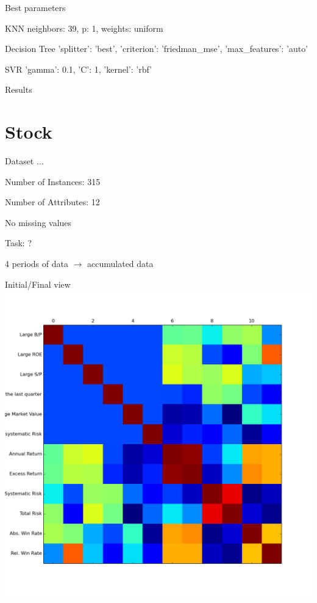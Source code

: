 \documentclass[12pt]{beamer}
\begin{document}
\begin{frame}{Best parameters}
\begin{block}{KNN}
neighbors: 39, p: 1, weights: uniform
\end{block}

\begin{block}{Decision Tree}
'splitter': 'best', 'criterion': 'friedman\_mse', 'max\_features': 'auto'
\end{block}

\begin{block}{SVR}
'gamma': 0.1, 'C': 1, 'kernel': 'rbf'
\end{block}
\end{frame}

\begin{frame}{Results}
\resizebox{\linewidth}{!}{}
\end{frame}

\section{Stock}
\begin{frame}{Dataset}
...

Number of Instances: 315

Number of Attributes: 12

No missing values

Task: ?

4 periods of data $\rightarrow$ accumulated data
\end{frame}

\begin{frame}{Initial/Final view}
\includegraphics[height=\textheight,width=\textwidth,keepaspectratio]{plots/stock_final.png}
\end{frame}
\end{document}
